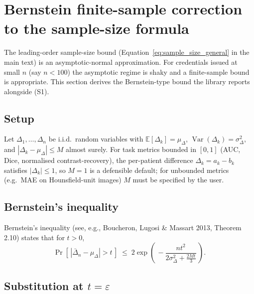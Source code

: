 \documentclass[twoside,11pt]{article}
\begin{document}



\clearpage
\appendix
\renewcommand{\thesection}{S\arabic{section}}
\setcounter{section}{0}

\section{Bernstein finite-sample correction to the sample-size formula}
\label{supp:bernstein}

The leading-order sample-size bound (Equation~\eqref{eq:sample_size_general} in the main text) is an asymptotic-normal approximation. For credentials issued at small $n$ (say $n < 100$) the asymptotic regime is shaky and a finite-sample bound is appropriate. This section derives the Bernstein-type bound the library reports alongside (S1).

\subsection{Setup}

Let $\Delta_1, \ldots, \Delta_n$ be i.i.d.\ random variables with $\mathbb{E}[\Delta_k] = \mu_\Delta$, $\operatorname{Var}(\Delta_k) = \sigma_\Delta^2$, and $|\Delta_k - \mu_\Delta| \leq M$ almost surely. For task metrics bounded in $[0, 1]$ (AUC, Dice, normalised contrast-recovery), the per-patient difference $\Delta_k = a_k - b_k$ satisfies $|\Delta_k| \leq 1$, so $M = 1$ is a defensible default; for unbounded metrics (e.g.\ MAE on Hounsfield-unit images) $M$ must be specified by the user.

\subsection{Bernstein's inequality}

Bernstein's inequality (see, e.g., Boucheron, Lugosi \& Massart 2013, Theorem 2.10) states that for $t > 0$,
\begin{equation}
    \Pr\!\left[\,\left|\bar\Delta_n - \mu_\Delta\right| > t\,\right]
    \;\leq\; 2 \exp\!\left(\,-\frac{n t^2}{2 \sigma_\Delta^2 + \tfrac{2 M t}{3}}\,\right).
    \label{eq:bernstein}
\end{equation}

\subsection{Substitution at $t = \varepsilon$}
\end{document}
